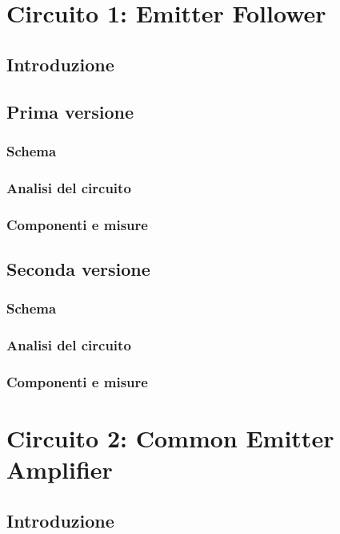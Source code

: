 \chapter{Circuito 1: Emitter Follower}
\section{Introduzione} 
\section{Prima versione} %
\subsection{Schema} 
\subsection{Analisi del circuito} 
\subsection{Componenti e misure} 
\section{Seconda versione} %
\subsection{Schema} 
\subsection{Analisi del circuito} %
\subsection{Componenti e misure} 


\clearpage
\newpage
\chapter{Circuito 2: Common Emitter Amplifier}
\section{Introduzione} 
